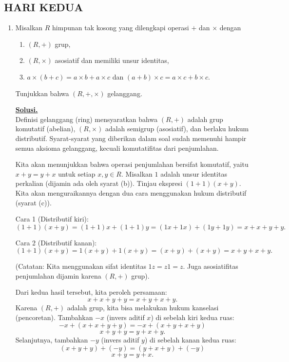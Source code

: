 \documentclass[12pt,twoside]{article}
\newenvironment{solution}
{
	\par\noindent\textbf{\underline{Solusi.}}\\
}
{
	\par
}
\begin{document}
\subsection{HARI KEDUA}
\begin{enumerate}
  \item Misalkan $R$ himpunan tak kosong yang dilengkapi operasi $+$ dan $\times$ dengan
        \begin{enumerate}
          \item [(a)] $(R,+)$ grup,
          \item[(b)] $(R,\times)$ asosiatif dan memiliki unsur identitas,
          \item[(c)] $a\times(b+c)=a\times b+ a\times c$ dan $(a+b)\times c=a\times c+b\times c$.
        \end{enumerate}
        Tunjukkan bahwa $(R,+,\times)$ gelanggang.
        \begin{solution}
          Definisi gelanggang (ring) mensyaratkan bahwa $(R,+)$ adalah grup komutatif (abelian), $(R,\times)$ adalah semigrup (asosiatif), dan berlaku hukum distributif.
          Syarat-syarat yang diberikan dalam soal sudah memenuhi hampir semua aksioma gelanggang, kecuali komutatifitas dari penjumlahan.

          Kita akan menunjukkan bahwa operasi penjumlahan bersifat komutatif, yaitu $x+y=y+x$ untuk setiap $x,y\in R$.
          Misalkan $1$ adalah unsur identitas perkalian (dijamin ada oleh syarat (b)).
          Tinjau ekspresi $(1+1)(x+y)$. Kita akan menguraikannya dengan dua cara menggunakan hukum distributif (syarat (c)).

          Cara 1 (Distributif kiri):
          \[ (1+1)(x+y) = (1+1)x + (1+1)y = (1x+1x) + (1y+1y) = x+x+y+y. \]

          Cara 2 (Distributif kanan):
          \[ (1+1)(x+y) = 1(x+y) + 1(x+y) = (x+y) + (x+y) = x+y+x+y. \]

          (Catatan: Kita menggunakan sifat identitas $1z=z1=z$. Juga asosiatifitas penjumlahan dijamin karena $(R,+)$ grup).

          Dari kedua hasil tersebut, kita peroleh persamaan:
          \[ x+x+y+y = x+y+x+y. \]
          Karena $(R,+)$ adalah grup, kita bisa melakukan hukum kanselasi (pencoretan).
          Tambahkan $-x$ (invers aditif $x$) di sebelah kiri kedua ruas:
          \[ -x + (x+x+y+y) = -x + (x+y+x+y) \]
          \[ x+y+y = y+x+y. \]
          Selanjutnya, tambahkan $-y$ (invers aditif $y$) di sebelah kanan kedua ruas:
          \[ (x+y+y) + (-y) = (y+x+y) + (-y) \]
          \[ x+y = y+x. \]


\end{solution}
\end{enumerate}
\end{document}
